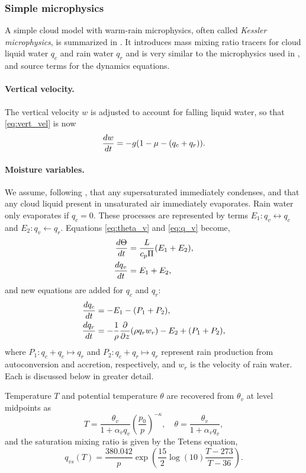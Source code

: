 \subsubsection{Simple microphysics}

A simple cloud model with warm-rain microphysics, often called \emph{Kessler microphysics}, is summarized in \cite[ch.~15]{RogersYau}.
It introduces mass mixing ratio tracers for cloud liquid water $q_c$ and rain water $q_r$ and is very similar to the microphysics used in \cite{SoongOgura1973,KlempWilhelmson1978}, and source terms for the dynamics equations.

\paragraph{Vertical velocity.} The vertical velocity $w$ is adjusted to account for falling liquid water, so that \eqref{eq:vert_vel} is now
\begin{equation*}
  \frac{ d w}{d t} = -g(1-\mu -(q_c+q_r)).  
\end{equation*}


\paragraph{Moisture variables.}
We assume, following \cite{SoongOgura1973,KlempWilhelmson1978}, that any supersaturated immediately condenses, and that any cloud liquid present in unsaturated air immediately evaporates.
Rain water only evaporates if $q_c = 0$.
These processes are represented by terms $E_1:q_v\leftrightarrow q_c$ and $E_2:q_v \leftarrow q_r$.
Equations \eqref{eq:theta_v} and \eqref{eq:q_v} become,
\begin{align}
  \frac{ d \Theta}{d t} &= \frac{L}{c_p \Pi }(E_1 + E_2), \\
  \frac{ d q_v}{d t} &= E_1 + E_2,
\end{align}
and new equations are added for $q_c$ and $q_r$:
\begin{align}
  \frac{ d q_c}{d t} &= -E_1 - (P_1 + P_2),\label{eq:cloud_water} \\
  \frac{ d q_r}{d t} &= -\frac{1}{\rho}\frac{\partial  }{\partial z}(\rho q_r w_r) - E_2 + (P_1 + P_2), \label{eq:rain_water}
\end{align}
where $P_1:q_c+q_c\mapsto q_r$ and $P_2:q_c+q_r\mapsto q_r$ represent rain production from autoconversion and accretion, respectively, and $w_r$ is the velocity of rain water. Each is discussed below in greater detail.

Temperature $T$ and potential temperature $\theta$ are recovered from $\theta_v$ at level midpoints as
\begin{equation}\label{eq:temperature}
  T = \frac{\theta_v}{1+\alpha_v q_v} \left(\frac{p_0}{p}\right)^{-\kappa}, \quad \theta = \frac{\theta_v}{1+\alpha_vq_v},
\end{equation}
and the saturation mixing ratio is given by the Tetens equation,
\begin{equation}\label{eq:tetens}
  q_{vs}(T) = \frac{380.042}{p}\exp\left(\frac{15}{2}\log(10) \frac{T-273}{T-36}\right).
\end{equation}

